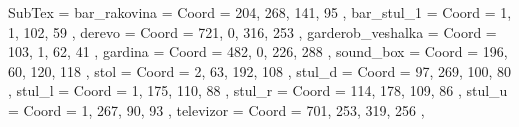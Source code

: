 SubTex = {
	bar_rakovina								= { Coord = { 204, 268, 141, 95 } },
	bar_stul_1								= { Coord = { 1, 1, 102, 59 } },
	derevo								= { Coord = { 721, 0, 316, 253 } },
	garderob_veshalka								= { Coord = { 103, 1, 62, 41 } },
	gardina								= { Coord = { 482, 0, 226, 288 } },
	sound_box								= { Coord = { 196, 60, 120, 118 } },
	stol								= { Coord = { 2, 63, 192, 108 } },
	stul_d								= { Coord = { 97, 269, 100, 80 } },
	stul_l								= { Coord = { 1, 175, 110, 88 } },
	stul_r								= { Coord = { 114, 178, 109, 86 } },
	stul_u								= { Coord = { 1, 267, 90, 93 } },
	televizor								= { Coord = { 701, 253, 319, 256 } },
}
